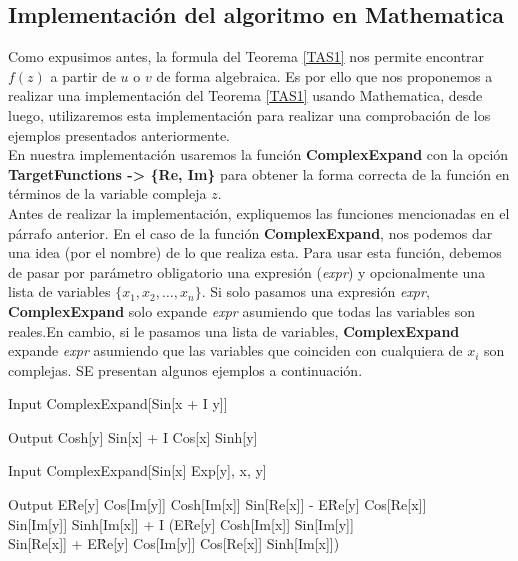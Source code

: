\subsection{Implementación del algoritmo en Mathematica }
Como expusimos antes, la formula  del Teorema \ref{TAS1} nos permite encontrar $f(z)$ a partir de $u$ o $v$ de forma algebraica. Es por ello que nos proponemos a realizar una implementación del Teorema \ref{TAS1} usando Mathematica, desde luego, utilizaremos esta implementación para realizar una comprobación de los ejemplos presentados anteriormente.\\
\noindent En nuestra implementación usaremos la función \textbf{ComplexExpand} con la opción \textbf{TargetFunctions -> \{Re, Im\}} para obtener la forma correcta de la función en términos de la variable compleja $z$.\\
\noindent Antes de realizar la implementación, expliquemos las funciones mencionadas en el párrafo anterior. En el caso de la función \textbf{ComplexExpand}, nos podemos dar una idea (por el nombre) de lo que realiza esta. Para usar esta función, debemos de pasar por parámetro obligatorio una expresión (\textit{expr}) y opcionalmente una lista de variables $\{x_1,x_2,\ldots,x_n\}$.  Si solo pasamos una expresión \textit{expr}, \textbf{ComplexExpand} solo   expande \textit{expr} asumiendo que todas las variables son reales.En cambio, si le pasamos una lista de variables, \textbf{ComplexExpand} expande \textit{expr} asumiendo que las variables que coinciden con cualquiera de $x_i$ son complejas. SE presentan algunos ejemplos a continuación.

\begin{mmaCell}{Input}
 	 ComplexExpand[Sin[x + I y]]
\end{mmaCell}

\begin{mmaCell}{Output}
	 Cosh[y] Sin[x] + I Cos[x] Sinh[y]
\end{mmaCell}

\begin{mmaCell}{Input}
	 ComplexExpand[Sin[x] Exp[y], {x, y}]
\end{mmaCell}

\begin{mmaCell}{Output}
	 E\^Re[y] Cos[Im[y]] Cosh[Im[x]] Sin[Re[x]] - E\^Re[y] Cos[Re[x]]\\Sin[Im[y]] Sinh[Im[x]] + I (E\^Re[y] Cosh[Im[x]] Sin[Im[y]] \\Sin[Re[x]] + E\^Re[y] Cos[Im[y]] Cos[Re[x]] Sinh[Im[x]])
\end{mmaCell}

